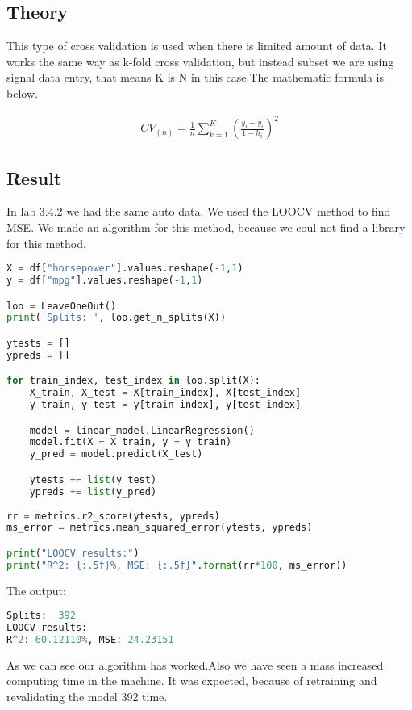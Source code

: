 \subsection{Theory}
This type of cross validation is used when there is limited amount of data. It works the same way as k-fold cross validation, but instead subset we are using signal data entry, that means K is N in this case.The mathematic formula is below. 

\begin{align}\label{fo:LOOCV}
CV_{(n)} = \frac {1}{n} \sum_{k=1}^{K}  (\frac {y_i-\hat{y_i}}{1- h_i})^2
\end{align}
\subsection{Result}
In lab 3.4.2 we had the same auto data. We used the LOOCV method to find MSE. We made an algorithm for this method, because we coul not find a library for this method.

\begin{lstlisting}[language=Python]
X = df["horsepower"].values.reshape(-1,1)
y = df["mpg"].values.reshape(-1,1) 

loo = LeaveOneOut()
print('Splits: ', loo.get_n_splits(X))

ytests = []
ypreds = []

for train_index, test_index in loo.split(X):
	X_train, X_test = X[train_index], X[test_index]
	y_train, y_test = y[train_index], y[test_index]

	model = linear_model.LinearRegression()
	model.fit(X = X_train, y = y_train)
	y_pred = model.predict(X_test)

	ytests += list(y_test)
	ypreds += list(y_pred)
	
rr = metrics.r2_score(ytests, ypreds)
ms_error = metrics.mean_squared_error(ytests, ypreds)

print("LOOCV results:")
print("R^2: {:.5f}%, MSE: {:.5f}".format(rr*100, ms_error))
\end{lstlisting}

The output:
\begin{lstlisting}[language=Python]
Splits:  392
LOOCV results:
R^2: 60.12110%, MSE: 24.23151
\end{lstlisting}

As we can see our algorithm has worked.Also we have seen a mass increased computing time in the machine. It was expected, because of retraining and revalidating the model 392 time.




